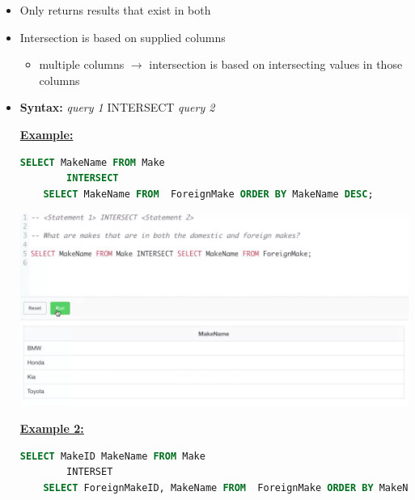 \documentclass[12pt]{article}
\begin{document}
\begin{itemize}
    \item Only returns results that exist in both
    \item Intersection is based on supplied columns
    \begin{itemize}
        \item multiple columns $\to$ intersection is based on intersecting values in those columns
    \end{itemize}
    \item \textbf{Syntax:} \textit{query 1} INTERSECT \textit{query 2}

    \bigskip

    \underline{\textbf{Example:}}

    \bigskip

    \begin{lstlisting}[language=SQL]
    SELECT MakeName FROM Make
        INTERSECT
    SELECT MakeName FROM  ForeignMake ORDER BY MakeName DESC;
    \end{lstlisting}

    \bigskip

    \begin{center}
    \includegraphics[width=\linewidth]{images/part_5_notes_4.png}
    \end{center}

    \bigskip

    \underline{\textbf{Example 2:}}

    \bigskip

    \begin{lstlisting}[language=SQL]
    SELECT MakeID MakeName FROM Make
        INTERSET
    SELECT ForeignMakeID, MakeName FROM  ForeignMake ORDER BY MakeName DESC; // <- Returns empty result
    \end{lstlisting}


\end{itemize}
\end{document}
